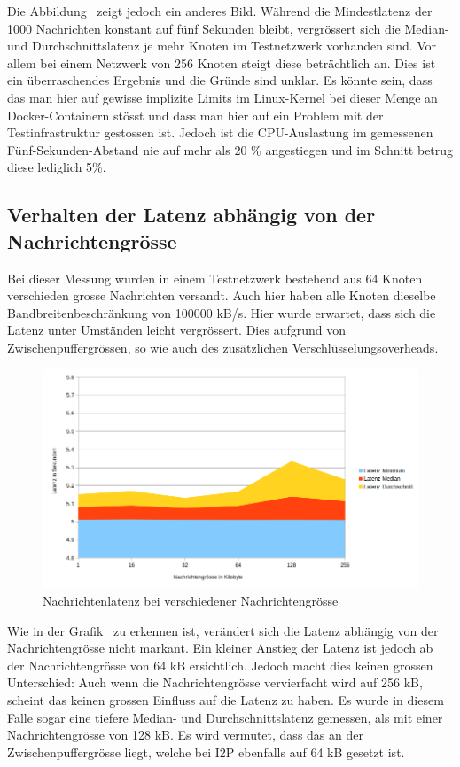 Die Abbildung~ zeigt jedoch ein anderes Bild.
Während die Mindestlatenz der 1000 Nachrichten konstant auf fünf Sekunden bleibt, vergrössert sich die Median- und Durchschnittslatenz je mehr Knoten im Testnetzwerk vorhanden sind.
Vor allem bei einem Netzwerk von 256 Knoten steigt diese beträchtlich an.
Dies ist ein überraschendes Ergebnis und die Gründe sind unklar.
Es könnte sein, dass das man hier auf gewisse implizite Limits im Linux-Kernel bei dieser Menge an Docker-Containern stösst
und dass man hier auf ein Problem mit der Testinfrastruktur gestossen ist.
Jedoch ist die CPU-Auslastung im gemessenen Fünf-Sekunden-Abstand nie auf mehr als 20 \% angestiegen und im Schnitt betrug diese lediglich 5\%.

\subsection{Verhalten der Latenz abhängig von der Nachrichtengrösse}\label{sec:messung_nachrichtengroesse}

Bei dieser Messung wurden in einem Testnetzwerk bestehend aus 64 Knoten verschieden grosse Nachrichten versandt.
Auch hier haben alle Knoten dieselbe Bandbreitenbeschränkung von 100000 kB/s.
Hier wurde erwartet, dass sich die Latenz unter Umständen leicht vergrössert. Dies aufgrund von Zwischenpuffergrössen, so wie auch des zusätzlichen Verschlüsselungsoverheads.

\begin{figure}[htp]
  \includegraphics[width=1.1\textwidth]{img/auswertung-nachrichtengroesse.png}
  \caption{Nachrichtenlatenz bei verschiedener Nachrichtengrösse}\label{fig:auswertung-nachrichtengroesse}
\end{figure}

Wie in der Grafik~ zu erkennen ist, verändert sich die Latenz abhängig von der Nachrichtengrösse nicht markant.
Ein kleiner Anstieg der Latenz ist jedoch ab der Nachrichtengrösse von 64 kB ersichtlich.
Jedoch macht dies keinen grossen Unterschied: Auch wenn die Nachrichtengrösse vervierfacht wird auf 256 kB, scheint das keinen grossen Einfluss auf die Latenz zu haben.
Es wurde in diesem Falle sogar eine tiefere Median- und Durchschnittslatenz gemessen, als mit einer Nachrichtengrösse von 128 kB.
Es wird vermutet, dass das an der Zwischenpuffergrösse liegt, welche bei I2P ebenfalls auf 64 kB gesetzt ist.

